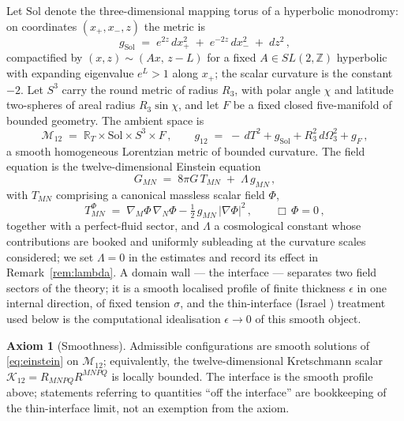\documentclass[11pt]{article}
\numberwithin{equation}{section}
\theoremstyle{plain}
\theoremstyle{definition}
\newtheorem{axiom}[theorem]{Axiom}
\theoremstyle{remark}
\newcommand{\M}{\mathcal{M}}
\newcommand{\Kr}{\mathcal{K}}
\newcommand{\Geff}{G}
\begin{document}
Let $\mathrm{Sol}$ denote the three-dimensional mapping torus of a
hyperbolic monodromy: on coordinates $(x_{+}, x_{-}, z)$ the metric is
\begin{equation}\label{eq:sol}
g_{\mathrm{Sol}} \;=\; e^{2z}\,dx_{+}^{2} \;+\; e^{-2z}\,dx_{-}^{2}
\;+\; dz^{2}\,,
\end{equation}
compactified by $(x, z) \sim (Ax,\, z - L)$ for a fixed
$A \in SL(2,\mathbb{Z})$ hyperbolic with expanding eigenvalue
$e^{L} > 1$ along $x_{+}$; the scalar curvature is the constant $-2$.
Let $S^{3}$ carry the round metric of radius $R_{3}$, with polar angle
$\chi$ and latitude two-spheres of areal radius $R_{3}\sin\chi$, and
let $F$ be a fixed closed five-manifold of bounded geometry. The
ambient space is
\begin{equation}\label{eq:block}
\M_{12} \;=\; \mathbb{R}_{T} \times \mathrm{Sol} \times S^{3} \times
F\,, \qquad
g_{12} \;=\; -\,dT^{2} + g_{\mathrm{Sol}} + R_{3}^{2}\,d\Omega_{3}^{2}
+ g_{F}\,,
\end{equation}
a smooth homogeneous Lorentzian metric of bounded curvature. The field
equation is the twelve-dimensional Einstein equation
\begin{equation}\label{eq:einstein}
G_{MN} \;=\; 8\pi \Geff\, T_{MN} \;+\; \Lambda\, g_{MN}\,,
\end{equation}
with $T_{MN}$ comprising a canonical massless scalar field $\Phi$,
\begin{equation}\label{eq:scalar}
T^{\Phi}_{MN} \;=\; \nabla_{M}\Phi\,\nabla_{N}\Phi
- \tfrac12\, g_{MN}\,\lvert\nabla\Phi\rvert^{2}\,, \qquad
\Box\,\Phi = 0\,,
\end{equation}
together with a perfect-fluid sector, and $\Lambda$ a cosmological
constant whose contributions are booked and uniformly subleading at
the curvature scales considered; we set $\Lambda = 0$ in the estimates
and record its effect in Remark~\ref{rem:lambda}. A domain wall ---
the interface --- separates two field sectors of the theory; it is a
smooth localised profile of finite thickness $\epsilon$ in one
internal direction, of fixed tension $\sigma$, and the thin-interface
(Israel \cite{Israel1966}) treatment used below is the computational
idealisation $\epsilon \to 0$ of this smooth object.

\begin{axiom}[Smoothness]\label{ax:smooth}
Admissible configurations are smooth solutions of
\eqref{eq:einstein} on $\M_{12}$; equivalently, the twelve-dimensional
Kretschmann scalar $\Kr_{12} = R_{MNPQ}R^{MNPQ}$ is locally bounded.
The interface is the smooth profile above; statements referring to
quantities ``off the interface'' are bookkeeping of the thin-interface
limit, not an exemption from the axiom.
\end{axiom}
\end{document}
